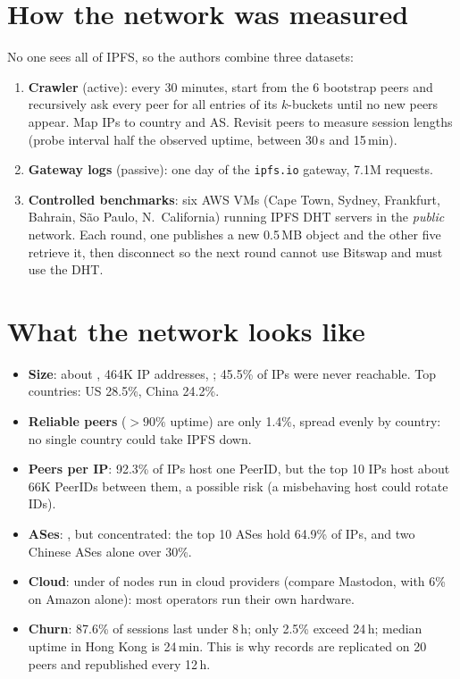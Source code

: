 \section{How the network was measured}
No one sees all of IPFS, so the authors combine three datasets:
\begin{enumerate}
  \item \textbf{Crawler} (active): every 30 minutes, start from the 6 bootstrap peers and recursively ask every peer for all entries of its $k$-buckets until no new peers appear.
        Map IPs to country and AS. Revisit peers to measure session lengths (probe interval half the observed uptime, between 30\,s and 15\,min).
  \item \textbf{Gateway logs} (passive): one day of the \texttt{ipfs.io} gateway, 7.1M requests.
  \item \textbf{Controlled benchmarks}: six AWS VMs (Cape Town, Sydney, Frankfurt, Bahrain, S\~ao Paulo, N.\ California) running IPFS DHT servers in the \emph{public} network.
        Each round, one publishes a new 0.5\,MB object and the other five retrieve it, then disconnect so the next round cannot use Bitswap and must use the DHT.
\end{enumerate}

\section{What the network looks like}
\begin{itemize}
  \item \textbf{Size}: about , 464K IP addresses, ; 45.5\% of IPs were never reachable. Top countries: US 28.5\%, China 24.2\%.
  \item \textbf{Reliable peers} ($>90\%$ uptime) are only 1.4\%, spread evenly by country: no single country could take IPFS down.
  \item \textbf{Peers per IP}: 92.3\% of IPs host one PeerID, but the top 10 IPs host about 66K PeerIDs between them, a possible risk (a misbehaving host could rotate IDs).
  \item \textbf{ASes}: , but concentrated: the top 10 ASes hold 64.9\% of IPs, and two Chinese ASes alone over 30\%.
  \item \textbf{Cloud}: under  of nodes run in cloud providers (compare Mastodon, with 6\% on Amazon alone): most operators run their own hardware.
  \item \textbf{Churn}: 87.6\% of sessions last under 8\,h; only 2.5\% exceed 24\,h; median uptime in Hong Kong is 24\,min. This is why records are replicated on 20 peers and
        republished every 12\,h.
\end{itemize}

